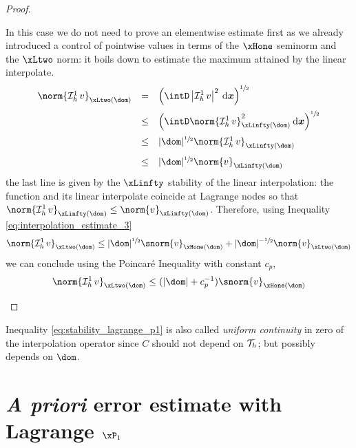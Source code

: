 \begin{proof}
\begin{tmaproofitems}
In this case we do not need to prove an elementwise estimate first as we already introduced a control of pointwise values in terms of the $\xHone$ seminorm and the $\xLtwo$ norm: it boils down to estimate the maximum attained by the linear interpolate.
\begin{equation*}
\begin{array}{lcl}
\norm{\Lgrh{1}v}_{\xLtwo(\dom)} &=&\displaystyle \left(\intD \Abs{\Lgrh{1}v}^2 \dxx\right)^{\sfrac{1}{2}}\\[2ex]
                              &\leq&\displaystyle \left(\intD \norm{\Lgrh{1}v}_{\xLinfty(\dom)}^2 \dxx\right)^{\sfrac{1}{2}}\\[2ex]
                              &\leq& |\dom|^{\sfrac{1}{2}} \norm{\Lgrh{1}v}_{\xLinfty(\dom)}\\[2ex]
                              &\leq& |\dom|^{\sfrac{1}{2}} \norm{v}_{\xLinfty(\dom)}\\
\end{array}
\end{equation*}
the last line is given by the $\xLinfty$ stability of the linear interpolation: the function and its linear interpolate coincide at Lagrange nodes so that $\norm{\Lgrh{1}v}_{\xLinfty(\dom)} \leq \norm{v}_{\xLinfty(\dom)}$.
Therefore, using Inequality \eqref{eq:interpolation_estimate_3}
\begin{equation*}
\norm{\Lgrh{1}v}_{\xLtwo(\dom)}  \leq |\dom|^{\sfrac{1}{2}}\snorm{v}_{\xHone(\dom)} + |\dom|^{-\sfrac{1}{2}}\norm{v}_{\xLtwo(\dom)}
\end{equation*}
we can conclude using the Poincaré Inequality with constant $c_p$,
\begin{equation*}
\norm{\Lgrh{1}v}_{\xLtwo(\dom)}  \leq (|\dom| + c_p^{-1})\snorm{v}_{\xHone(\dom)}
\end{equation*}
\end{tmaproofitems}
\end{proof}

Inequality \eqref{eq:stability_lagrange_p1} is also called \textit{uniform continuity} in zero of the interpolation operator since $C$ should not depend on ${\mathcal T}_h$; but possibly depends on $\dom$.

\section{\textit{A priori} error estimate with Lagrange $\xPone$}

